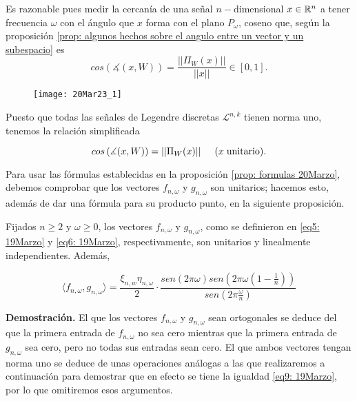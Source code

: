 Es razonable pues
medir la cercanía de una señal $n-$dimensional $x \in \mathbb{R}^{n}$
a tener frecuencia $\omega$
con el ángulo que $x$ forma con el plano $P_{\omega}$,
coseno que, según la proposición
\ref{prop: algunos hechos sobre el angulo entre un vector y un subespacio}
es
\begin{equation}
\label{eq0: 20Mar}
cos \left( \measuredangle (x, W) \right) = \frac{|| \Pi_{W}(x) ||}{||x||}
\in [0,1].
\end{equation}

\begin{figure}[H]
	\centering
	\texttt{[image: 20Mar23\_1]} 
\end{figure}	

Puesto que todas las señales de Legendre discretas
$\mathcal{L}^{n,k}$ tienen norma uno,
tenemos la relación simplificada 

\begin{equation}
\label{eq1: 20Mar}
cos \left( \measuredangle (x, W) \right) = || \Pi_{W}(x) || 
\hspace{0.5cm} (x \hspace{0.1cm} \text{unitario).}
\end{equation}

Para usar las fórmulas establecidas en 
la proposición \ref{prop: formulas 20Marzo}, debemos comprobar
que los vectores $f_{n, \omega}$ y $g_{n, \omega}$
son unitarios; hacemos esto, además de dar una fórmula
para su producto punto, en la siguiente proposición.


\begin{prop}
Fijados $n \geq 2$ y $\omega \geq 0$, los vectores
$f_{n, \omega}$ y $g_{n, \omega}$, como se definieron
en \eqref{eq5: 19Marzo}
y \eqref{eq6: 19Marzo}, respectivamente, 
son unitarios y linealmente independientes.
Además, 

\begin{equation}
\label{eq9: 19Marzo}
\langle f_{n, \omega} , g_{n, \omega} \rangle =
\frac{\xi_{n, w} \eta_{n, \omega}}{2} \cdot 
\frac{sen(2 \pi \omega)
sen(2 \pi \omega \left( 1- \frac{1}{n} \right))}{sen \left(2 \pi 
\frac{\omega}{n} \right)}
\end{equation}

\end{prop}
\noindent
\textbf{Demostración.}
El que los
vectores $f_{n, \omega}$ y $g_{n, \omega}$ sean ortogonales
se deduce del que la primera entrada de $f_{n, \omega}$ no sea cero
mientras que la primera entrada de $g_{n, \omega}$ sea cero, pero no
todas sus entradas sean cero. El que ambos vectores tengan norma
uno se deduce de unas operaciones análogas a las que realizaremos a
continuación para demostrar que en efecto se tiene la igualdad 
\eqref{eq9: 19Marzo}, por lo que omitiremos esos argumentos.


